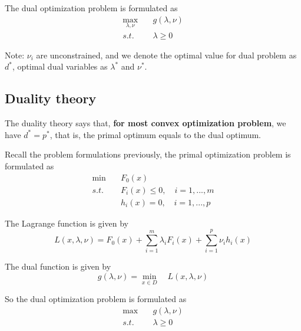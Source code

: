\begin{definition} The dual optimization problem is formulated as
	\begin{align*}
		\max_{\lambda, \nu} \quad&g(\lambda, \nu) \\
		s.t. \quad&\lambda \geq 0
	\end{align*}
	
	Note: $\nu_i$ are unconstrained, and we denote the optimal value for dual problem as $d^*$, optimal dual variables as $\lambda^*$ and $\nu^*$.
\end{definition}


\subsection{Duality theory}
The duality theory says that, \textbf{for most convex optimization problem}, we have $d^* = p^*$, that is, the primal optimum equals to the dual optimum.

Recall the problem formulations previously, the primal optimization problem is formulated as 
\begin{align*}
	\min \quad&F_0(x) \\
	s.t. \quad&F_i(x)\leq 0, \quad i = 1,...,m \\
	&h_i(x)= 0, \quad i = 1,...,p
\end{align*}

The Lagrange function is given by 
\begin{equation*}
	L(x,\lambda,\nu) = F_0(x) + \sum^m_{i=1}\lambda_i F_i(x) + \sum^p_{i=1}\nu_i h_i(x)
\end{equation*}

The dual function is given by
\begin{equation*}
	g(\lambda, \nu) = \min_{x\in D}\quad L(x,\lambda,\nu) 
\end{equation*}

So the dual optimization problem is formulated as 
\begin{align*}
	\max \quad&g(\lambda, \nu) \\
	s.t. \quad&\lambda \geq 0
\end{align*}



